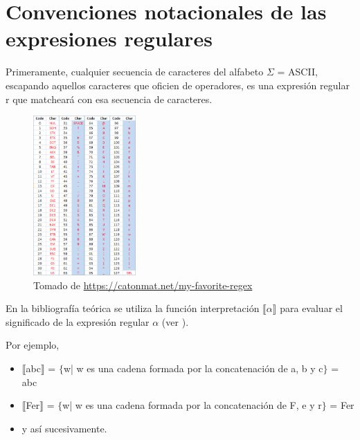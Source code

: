 \documentclass{beamer}
\begin{document}
\section{Convenciones notacionales de las expresiones regulares}

\begin{frame}
Primeramente, cualquier secuencia de caracteres del alfabeto $\Sigma$ = ASCII, escapando aquellos caracteres que oficien de operadores, es una expresión regular r que matcheará con esa secuencia de caracteres. 

\begin{center}\begin{figure}\includegraphics[width=0.35\textwidth]{aux/ascii-table.png}\caption{Tomado de \url{https://catonmat.net/my-favorite-regex}}\end{figure}\end{center}

\end{frame}

\begin{frame}
En la bibliografía teórica se utiliza la función interpretación $\llbracket\alpha\rrbracket$ para evaluar el significado de la expresión regular $\alpha$ (ver \citealt{Wintner:2010formallanguages}). 

Por ejemplo,
\begin{itemize}
\item $\llbracket$abc$\rrbracket$ = $\lbrace$w| w es una cadena formada por la concatenación de a, b y c$\rbrace$ = abc
\item $\llbracket$Fer$\rrbracket$ = $\lbrace$w| w es una cadena formada por la concatenación de F, e y r$\rbrace$ = Fer
\item y así sucesivamente.
\end{itemize}

\end{frame}
\end{document}
